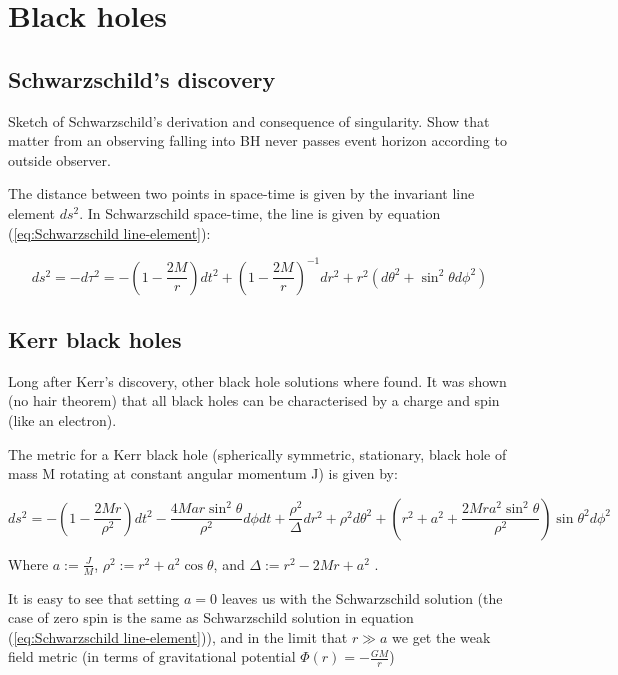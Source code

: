 \chapter{Black holes}

\section{Schwarzschild's discovery}
Sketch of Schwarzschild's derivation and consequence of singularity. Show that matter from an observing falling into BH never passes event horizon according to outside observer.

The distance between two points in space-time is given by the invariant line element $ds^2$. In Schwarzschild space-time, the line is given by equation (\ref{eq:Schwarzschild line-element}):

\begin{equation}
    ds^2 = - d\tau^2 = - (1-\frac{2 M}{r}) dt^2 +  (1-\frac{2 M}{r})^{-1} dr^2
            + r^2 (d\theta^2+\sin^2\theta d\phi^2)
\label{eq:Schwarzschild line-element}
\end{equation}

\section{Kerr black holes}
Long after Kerr's discovery, other black hole solutions where found. It was shown (no hair theorem) that all black holes can be characterised by a charge and spin (like an electron). 

The metric for a Kerr black hole (spherically symmetric, stationary, black hole of mass M rotating at constant angular momentum J) is given by:

\begin{equation}\label{eq:Kerr metric}
    ds^2 = -\left(1-\frac{2Mr}{\rho^2}\right) dt^2-\frac{4Mar \sin^2{\theta}}{\rho^2} d\phi dt+ \frac{\rho^2}{\Delta} dr^2 + \rho^2 d\theta^2 +\left(r^2+a^2+
    \frac{2Mra^2\sin^2{\theta}}{\rho^2}
    \right)\sin{\theta}^2 d\phi^2
\end{equation}

Where $a:=\frac{J}{M}$, $\rho^2:=r^2+a^2 \cos{\theta}$, and $\Delta:=r^2-2Mr+a^2$ \cite{carroll2019spacetime}.

It is easy to see that setting $a=0$ leaves us with the Schwarzschild solution (the case of zero spin is the same as Schwarzschild solution in equation (\ref{eq:Schwarzschild line-element})), and in the limit that $r \gg a$ we get the weak field metric (in terms of gravitational potential $\Phi(r)=-\frac{G M}{r}$)

